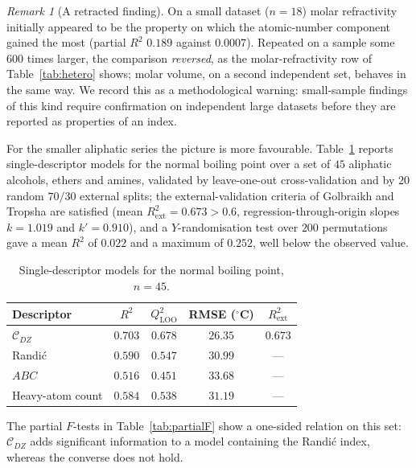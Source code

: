 \documentclass[11pt,a4paper]{article}
\theoremstyle{plain}
\theoremstyle{definition}
\theoremstyle{remark}
\newtheorem{remark}[theorem]{Remark}
\newcommand{\CDZ}{\mathcal{C}_{DZ}}
\begin{document}
\begin{remark}[A retracted finding]
\label{rem:retracted}
On a small dataset ($n=18$) molar refractivity initially appeared to be the
property on which the atomic-number component gained the most (partial $R^2$
$0.189$ against $0.0007$). Repeated on a sample some $600$ times larger, the
comparison \emph{reversed}, as the molar-refractivity row of
Table~\ref{tab:hetero} shows; molar volume, on a second independent set,
behaves in the same way.
We record this as a methodological warning: small-sample findings of this kind
require confirmation on independent large datasets before they are reported as
properties of an index.
\end{remark}

For the smaller aliphatic series the picture is more favourable.
Table~\ref{tab:small} reports single-descriptor models for the normal boiling
point over a set of $45$ aliphatic alcohols, ethers and amines, validated by
leave-one-out cross-validation and by $20$ random $70/30$ external splits; the
external-validation criteria of Golbraikh and Tropsha \cite{golbraikh2002} are
satisfied (mean $R^2_{\mathrm{ext}}=0.673>0.6$, regression-through-origin slopes
$k=1.019$ and $k'=0.910$), and a $Y$-randomisation test over $200$ permutations
gave a mean $R^2$ of $0.022$ and a maximum of $0.252$, well below the observed
value.

\begin{table}[htbp]
\centering
\caption{Single-descriptor models for the normal boiling point, $n=45$.}
\label{tab:small}
\begin{tabular}{lcccc}
\toprule
Descriptor & $R^2$ & $Q^2_{\mathrm{LOO}}$ & RMSE ($^\circ$C) & $R^2_{\mathrm{ext}}$ \\
\midrule
$\CDZ$           & $0.703$ & $0.678$ & $26.35$ & $0.673$ \\
Randi\'c         & $0.590$ & $0.547$ & $30.99$ & --- \\
$ABC$            & $0.516$ & $0.451$ & $33.68$ & --- \\
Heavy-atom count & $0.584$ & $0.538$ & $31.19$ & --- \\
\bottomrule
\end{tabular}
\end{table}

The partial $F$-tests in Table~\ref{tab:partialF} show a one-sided relation on
this set: $\CDZ$ adds significant information to a model containing the Randi\'c
index, whereas the converse does not hold.
\end{document}

